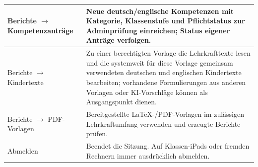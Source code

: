 \documentclass[12pt,a4paper]{article}
\begin{document}
\begin{longtable}{|p{}|p{}|}
\hline
Berichte \(\rightarrow\) Kompetenzanträge & Neue deutsch/englische Kompetenzen mit Kategorie, Klassenstufe und Pflichtstatus zur Adminprüfung einreichen; Status eigener Anträge verfolgen.\\
\hline
Berichte \(\rightarrow\) Kindertexte & Zu einer berechtigten Vorlage die Lehrkrafttexte lesen und die systemweit für diese Vorlage gemeinsam verwendeten deutschen und englischen Kindertexte bearbeiten; vorhandene Formulierungen aus anderen Vorlagen oder KI-Vorschläge können als Ausgangspunkt dienen.\\
\hline
Berichte \(\rightarrow\) PDF-Vorlagen & Bereitgestellte LaTeX-/PDF-Vorlagen im zulässigen Lehrkraftumfang verwenden und erzeugte Berichte prüfen.\\
\hline
Abmelden & Beendet die Sitzung. Auf Klassen-iPads oder fremden Rechnern immer ausdrücklich abmelden.\\
\hline
\end{longtable}
\normalsize
\end{document}
